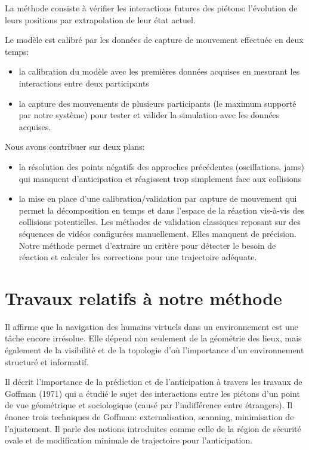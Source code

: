 \documentclass[11pt]{article}
\begin{document}
La méthode consiste à vérifier les interactions futures des piétons: l'évolution de leurs positions par extrapolation de leur état actuel.

Le modèle est calibré par les données de capture de mouvement effectuée en deux temps:
\begin{itemize}
\item la calibration du modèle avec les premières données acquises en mesurant les interactions entre deux participants
\item la capture des mouvements de plusieurs participants (le maximum supporté par notre système) pour tester et valider la simulation avec les données acquises.\newline
\end{itemize}

Nous avons contribuer sur deux plans:
\begin{itemize}
\item la résolution des points négatifs des approches précédentes (oscillations, jams) qui manquent d'anticipation et réagissent trop simplement face aux collisions
\item la mise en place d'une calibration/validation par capture de mouvement qui permet la décomposition en temps et dans l'espace de la réaction vis-à-vis des collisions potentielles. Les méthodes de validation classiques reposant sur des séquences de vidéos configurées manuellement. Elles manquent de précision. Notre méthode permet d'extraire un critère pour détecter le besoin de réaction et calculer les corrections pour une trajectoire adéquate.
\end{itemize}

\section{Travaux relatifs à notre méthode}

Il affirme que la navigation des humains virtuels dans un environnement est une tâche encore irrésolue. Elle dépend non seulement de la géométrie des lieux, mais également de la visibilité et de la topologie d'où l'importance d'un environnement structuré et informatif.

Il décrit l'importance de la prédiction et de l'anticipation à travers les travaux de Goffman (1971) qui a étudié le sujet des interactions entre les piétons d'un point de vue géométrique et sociologique (causé par l'indifférence entre étrangers). Il énonce trois techniques de Goffman: externalisation, scanning, minimisation de l'ajustement. Il parle des notions introduites comme celle de la région de sécurité ovale et de modification minimale de trajectoire pour l'anticipation.
\end{document}
